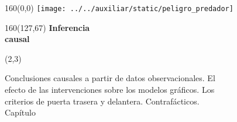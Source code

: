 \documentclass[shownotes,aspectratio=169]{beamer}
\newcounter{capitulo}
\newcommand{\unidad}{\thecapitulo \stepcounter{capitulo}}
\begin{document}
\begin{frame}

\begin{textblock}{160}(0,0)
\texttt{[image: ../../auxiliar/static/peligro\_predador]}
\end{textblock}

\begin{textblock}{160}(127,67)
\LARGE \textcolor{black!5}{\fontsize{22}{0}\selectfont \textbf{Inferencia  \\[-0.1cm] \hspace{0.5cm} causal}}
\end{textblock}

\begin{textblock}{55}(2,3)
\begin{turn}{0}
\parbox{15cm}{\small \textcolor{black!95}{Conclusiones causales a partir de datos observacionales. El} \\
\textcolor{black!95}{efecto de las intervenciones sobre los modelos gráficos. Los} \\
\textcolor{black!95}{criterios de puerta trasera y delantera. Contrafácticos.} \\
\normalsize\textcolor{black!95}{Capítulo \unidad} \\
}
\end{turn}
\end{textblock}


\end{frame}
\end{document}

